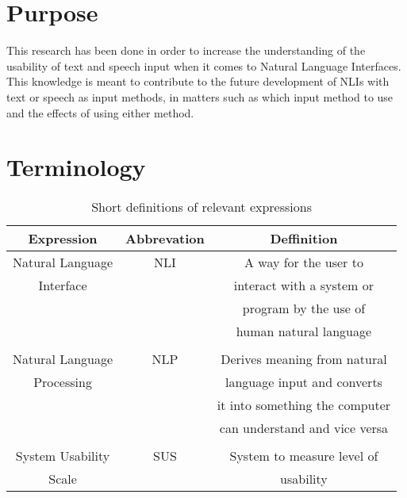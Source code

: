 \section{Purpose}
This research has been done in order to increase the understanding of the usability of text and speech input when it comes to Natural Language Interfaces. This knowledge is meant to contribute to the future development of NLIs with text or speech as input methods, in matters such as which input method to use and the effects of using either method.


\section{Terminology}

\begin{table}[ht]
  \centering
  \begin{tabular}{ccc}
    \toprule
    Expression & Abbrevation & Deffinition\\
    \midrule
    Natural Language & NLI & A way for the user to\\
    Interface & & interact with a system or\\ 
    & & program by the use of\\
    & & human natural language\\
    \\
    Natural Language & NLP & Derives meaning from natural\\
    Processing & & language input and converts\\
    & & it into something the computer\\
    & & can understand and vice versa\\
    \\
    System Usability & SUS & System to measure level of\\
    Scale & &  usability\\
    \bottomrule
  \end{tabular}
  \caption{Short definitions of relevant expressions}\label{termin}
\end{table}
